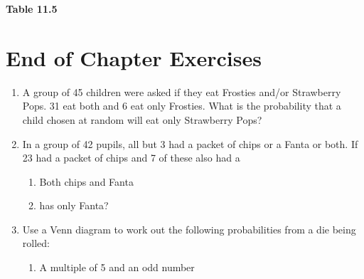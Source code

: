     \begin{center}{\small\bfseries Table 11.5}\end{center}
    \par
  \label{m39373*cid10}
            \section{ End of Chapter Exercises}
            \nopagebreak
            \label{m39373*id115876}\begin{enumerate}[noitemsep, label=\textbf{\arabic*}. ] 
            \label{m39373*uid104}\item A group of 45 children were asked if they eat Frosties and/or
Strawberry Pops. 31 eat both and 6 eat only Frosties. What is the probability
that a child chosen at random will eat only Strawberry Pops?\newline
\label{m39373*uid105}\item In a group of 42 pupils, all but 3 had a packet of
chips or a Fanta or both. If 23 had a packet of chips and 7 of these also had a
%     
\label{m39373*id115906}\begin{enumerate}[noitemsep, label=\textbf{\alph*}. ] 
            \label{m39373*uid106}\item Both chips and Fanta
\label{m39373*uid107}\item has only Fanta?
\end{enumerate}
                \label{m39373*uid108}\item Use a Venn diagram to work out the following
probabilities from a die being rolled:
\label{m39373*id115948}\begin{enumerate}[noitemsep, label=\textbf{\alph*}. ] 
            \label{m39373*uid109}\item A multiple of 5 and an odd number

\end{enumerate}
\end{enumerate}
